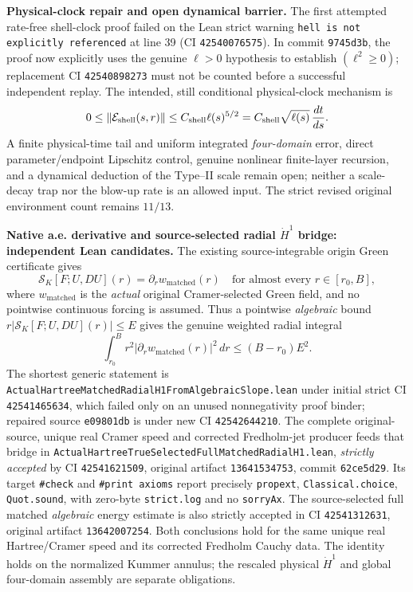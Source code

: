 \documentclass[11pt]{amsart}
\begin{document}
\medskip
\noindent\textbf{Physical-clock repair and open dynamical barrier.}
The first attempted rate-free shell-clock proof failed on the Lean
strict warning \texttt{hell is not explicitly referenced} at line
39 (CI \texttt{42540076575}). In commit \texttt{9745d3b},
the proof now explicitly uses the genuine $\ell>0$
hypothesis to establish $(\ell^2\ge0)$; replacement CI
\texttt{42540898273} must not be counted before a successful
independent replay. The intended, still conditional physical-clock
mechanism is
\[
 0\le\|\mathcal E_{\rm shell}(s,r)\|
 \le C_{\rm shell}\ell(s)^{5/2}
 =C_{\rm shell}\sqrt{\ell(s)}\,\frac{dt}{ds}.
\]
A finite physical-time tail and uniform integrated \emph{four-domain}
error, direct parameter/endpoint Lipschitz control, genuine
nonlinear finite-layer recursion, and a dynamical deduction of the
Type--II scale remain open; neither a scale-decay trap nor the
blow-up rate is an allowed input. The strict revised original
environment count remains $11/13$.



\medskip
\noindent\textbf{Native a.e. derivative and source-selected radial
$\dot H^1$ bridge: independent Lean candidates.}
The existing source-integrable origin Green certificate gives
\[
 \mathcal S_K[F;U,DU](r)
  =\partial_r w_{\mathrm{matched}}(r)
 \quad\text{for almost every }r\in[r_0,B],
\]
where \(w_{\mathrm{matched}}\) is the \emph{actual} original
Cramer-selected Green field, and no pointwise continuous forcing
is assumed. Thus a pointwise \emph{algebraic} bound
\(r|\mathcal S_K[F;U,DU](r)|\le E\) gives the genuine weighted
radial integral
\[
 \boxed{\;
 \int_{r_0}^{B} r^2
      |\partial_r w_{\mathrm{matched}}(r)|^2\,dr
 \le (B-r_0)E^2.
 \;}
\]
The shortest generic statement is
\texttt{ActualHartreeMatchedRadialH1FromAlgebraicSlope.lean}
under initial strict CI \texttt{42541465634}, which
failed only on an unused nonnegativity proof binder; repaired
source \texttt{e09801db} is under new CI
\texttt{42542644210}.
The complete original-source, unique real Cramer speed and
corrected Fredholm-jet producer feeds that bridge in
\texttt{ActualHartreeTrueSelectedFullMatchedRadialH1.lean},
\emph{strictly accepted} by CI \texttt{42541621509},
original artifact \texttt{13641534753}, commit
\texttt{62ce5d29}. Its target \texttt{\#check} and
\texttt{\#print axioms} report precisely
\texttt{propext}, \texttt{Classical.choice},
\texttt{Quot.sound}, with zero-byte \texttt{strict.log}
and no \texttt{sorryAx}.
The source-selected full matched \emph{algebraic} energy
estimate is also strictly accepted in CI
\texttt{42541312631}, original artifact
\texttt{13642007254}. Both conclusions hold for the
same unique real Hartree/Cramer speed and its corrected
Fredholm Cauchy data.
The identity holds on the normalized Kummer annulus; the
rescaled physical $\dot H^1$ and global four-domain assembly
are separate obligations.
\end{document}
